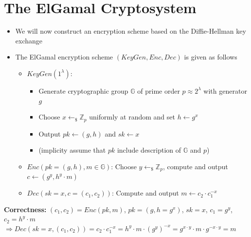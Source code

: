 \section{The ElGamal Cryptosystem}
	\begin{itemize}
		\item We will now construct an encryption scheme based on the Diffie-Hellman key exchange
		\item The ElGamal encryption scheme $(KeyGen,Enc,Dec)$ is given as follows
		\begin{itemize}
			\item $KeyGen(1^{\lambda})$:
			\begin{itemize}
				\item Generate cryptographic group $\mathbb{G}$ of prime order $p \approx 2^{\lambda}$ with generator $g$
				\item Choose $x \leftarrow_{\$} \mathbb{Z}_p$ uniformly at random and set $h \leftarrow g^x$
				\item Output $pk \leftarrow (g,h)$ and $sk \leftarrow x$
				\item (implicity assume that $pk$ include description of $\mathbb{G}$ and $p$)
			\end{itemize}
			\item $Enc(pk=(g,h),m \in \mathbb{G})$: Choose $y \leftarrow_{\$} \mathbb{Z}_p$, compute and output $c \leftarrow (g^y,h^y \cdot m)$
			\item $Dec(sk=x,c=(c_1,c_2))$: Compute and output $m \leftarrow c_2 \cdot c_1^{-x}$
		\end{itemize}
	\end{itemize}
	\textbf{Correctness:} $(c_1,c_2) = Enc(pk,m)$, $pk = (g,h=g^x)$, $sk=x$, $c_1 = g^y$, $c_2 = h^y \cdot m$\\
		$\Rightarrow Dec(sk=x,(c_1,c_2)) = c_2 \cdot c_1^{-x} = h^y \cdot m \cdot (g^y)^{-x} = g^{x \cdot y} \cdot m \cdot g^{-x \cdot y} = m$

